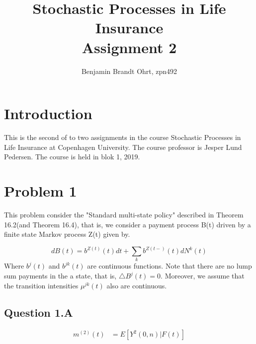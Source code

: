 \documentclass[10pt]{article}
\begin{document}
\title{Stochastic Processes in Life Insurance \\
\large Assignment 2}
\author{Benjamin Brandt Ohrt, zpn492}
\maketitle

\section{Introduction}
This is the second of to two assignments in the course Stochastic Processes in Life Insurance at Copenhagen University. The course professor is Jesper Lund Pedersen. The course is held in blok 1, 2019.

\section{Problem 1}

This problem consider the "Standard multi-state policy" described in Theorem 16.2(and Theorem 16.4), that is, we consider a payment process B(t) driven by a finite state Markov process Z(t) given by.

\begin{equation}
dB(t) = b^{Z(t)}(t)dt + \sum_k b^{Z(t-)}(t)dN^k(t)
\end{equation}
Where $b^j(t)$ and $b^{jk}(t)$ are continuous functions. Note that there are no lump sum payments in the a state, that is, $\triangle B^j(t) = 0$. Moreover, we assume that the transition intensities $\mu^{jk}(t)$ also are continuous.

\subsection{Question 1.A}

\begin{equation}
\begin{split}
m^{(2)}(t) 	& = E[Y^2(0,n)|F(t)] 
\end{split}
\end{equation}
\end{document}
